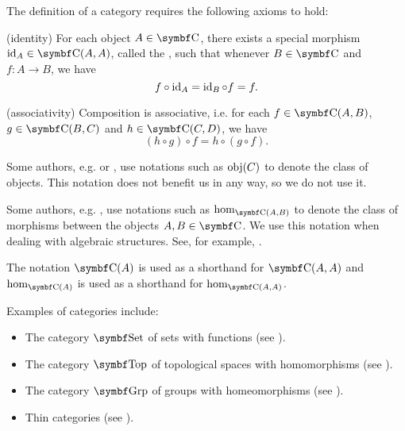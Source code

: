 \begin{definition}
  The definition of a category requires the following axioms to hold:
  \begin{DefEnum}[resume=def:category]
    (identity) For each object \( A \in \Cat{C} \), there exists a special morphism \( \Id_A \in \Cat{C}(A, A) \), called the , such that whenever \( B \in \Cat{C} \) and \( f: A \to B \), we have
    \begin{equation*}
      f \circ \operatorname{id}_A = \operatorname{id}_B \circ f = f.
    \end{equation*}

    (associativity) Composition is associative, i.e. for each \( f \in \Cat{C}(A, B) \), \( g \in \Cat{C}(B, C) \) and \( h \in \Cat{C}(C, D) \), we have
    \begin{equation*}
      (h \circ g) \circ f = h \circ (g \circ f).
    \end{equation*}
  \end{DefEnum}
\end{definition}

\begin{remark}\label{rem:category_obj_hom}
  Some authors, e.g. \cite{Leinster2014} or \cite{Aluffi2009}, use notations such as \( \operatorname{obj}(C) \) to denote the class of objects. This notation does not benefit us in any way, so we do not use it.

  Some authors, e.g. \cite{MacLane1994}, use notations such as \( \Op{hom}_{\Cat{C}(A, B)} \) to denote the class of morphisms between the objects \( A, B \in \Cat{C} \). We use this notation when dealing with algebraic structures. See, for example, .

  The notation \( \Cat{C}(A) \) is used as a shorthand for \( \Cat{C}(A, A) \) and \( \hom_{\Cat{C}(A)} \) is used as a shorthand for \( \hom_{\Cat{C}(A, A)} \).
\end{remark}

\begin{example}\label{ex:categories}
  Examples of categories include:

  \begin{itemize}
    \item The category \( \Cat{Set} \) of sets with functions (see ).
    \item The category \( \Cat{Top} \) of topological spaces with homomorphisms (see ).
    \item The category \( \Cat{Grp} \) of groups with homeomorphisms (see ).
    \item Thin categories (see ).
  \end{itemize}
\end{example}

